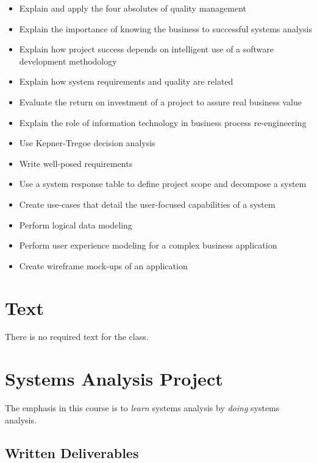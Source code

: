 \documentclass[11pt]{article}
\begin{document}
\begin{itemize}
\item Explain and apply the four absolutes of quality management
\item Explain the importance of knowing the business to successful systems analysis
\item Explain how project success depends on intelligent use of a software development
  methodology
\item Explain how system requirements and quality are related
\item Evaluate the return on investment of a project to assure real business value
\item Explain the role of information technology in business process re-engineering
\item Use Kepner-Tregoe decision analysis
\item Write well-posed requirements
\item Use a system response table to define project scope and decompose a system
\item Create use-cases that detail the user-focused capabilities of a system
\item Perform logical data modeling
\item Perform user experience modeling for a complex business application
\item Create wireframe mock-ups of an application
\end{itemize}

\section{Text}

There is no required text for the class.

\section{Systems Analysis Project}

The emphasis in this course is to \emph{learn} systems analysis by \emph{doing} systems analysis.

\subsection{Written Deliverables}
\end{document}
